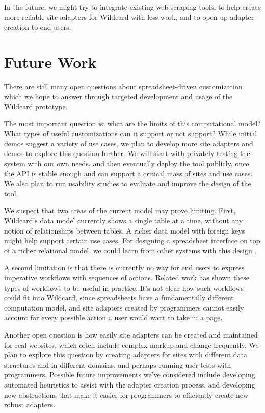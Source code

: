 \documentclass[english,submission]{programming}
\begin{document}
In the future, we might try to integrate existing web scraping tools, to
help create more reliable site adapters for Wildcard with less work, and
to open up adapter creation to end users.

\hypertarget{future-work}{%
\section{Future Work}\label{future-work}}

There are still many open questions about spreadsheet-driven
customization which we hope to answer through targeted development and
usage of the Wildcard prototype.

The most important question is: what are the limits of this
computational model? What types of useful customizations can it support
or not support? While initial demos suggest a variety of use cases, we
plan to develop more site adapters and demos to explore this question
further. We will start with privately testing the system with our own
needs, and then eventually deploy the tool publicly, once the API is
stable enough and can support a critical mass of sites and use cases. We
also plan to run usability studies to evaluate and improve the design of
the tool.

We suspect that two areas of the current model may prove limiting.
First, Wildcard's data model currently shows a single table at a time,
without any notion of relationships between tables. A richer data model
with foreign keys might help support certain use cases. For designing a
spreadsheet interface on top of a richer relational model, we could
learn from other systems with this design
\autocite{mccutchen2016,bakke2016}.

A second limitation is that there is currently no way for end users to
express imperative workflows with sequences of actions. Related work has
shown these types of workflows to be useful
\autocite{bolin2005,leshed2008} in practice. It's not clear how such
workflows could fit into Wildcard, since spreadsheets have a
fundamentally different computation model, and site adapters created by
programmers cannot easily account for every possible action a user would
want to take in a page.

Another open question is how easily site adapters can be created and
maintained for real websites, which often include complex markup and
change frequently. We plan to explore this question by creating adapters
for sites with different data structures and in different domains, and
perhaps running user tests with programmers. Possible future
improvements we've considered include developing automated heuristics to
assist with the adapter creation process, and developing new
abstractions that make it easier for programmers to efficiently create
new robust adapters.
\end{document}

